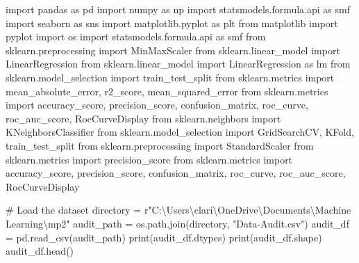 \documentclass[
  11pt,
  letterpaper,
  DIV=11,
  numbers=noendperiod]{scrartcl}
\newenvironment{Shaded}{\begin{snugshade}}{\end{snugshade}}
\newcommand{\BuiltInTok}[1]{\textcolor[rgb]{0.00,0.23,0.31}{#1}}
\newcommand{\CommentTok}[1]{\textcolor[rgb]{0.37,0.37,0.37}{#1}}
\newcommand{\ImportTok}[1]{\textcolor[rgb]{0.00,0.46,0.62}{#1}}
\newcommand{\NormalTok}[1]{\textcolor[rgb]{0.00,0.23,0.31}{#1}}
\newcommand{\OperatorTok}[1]{\textcolor[rgb]{0.37,0.37,0.37}{#1}}
\newcommand{\StringTok}[1]{\textcolor[rgb]{0.13,0.47,0.30}{#1}}
\newcommand{\VerbatimStringTok}[1]{\textcolor[rgb]{0.13,0.47,0.30}{#1}}
\begin{document}
\begin{Shaded}
\begin{Highlighting}[]
\ImportTok{import}\NormalTok{ pandas }\ImportTok{as}\NormalTok{ pd}
\ImportTok{import}\NormalTok{ numpy }\ImportTok{as}\NormalTok{ np}
\ImportTok{import}\NormalTok{ statsmodels.formula.api }\ImportTok{as}\NormalTok{ smf}
\ImportTok{import}\NormalTok{ seaborn }\ImportTok{as}\NormalTok{ sns}
\ImportTok{import}\NormalTok{ matplotlib.pyplot }\ImportTok{as}\NormalTok{ plt}
\ImportTok{from}\NormalTok{ matplotlib }\ImportTok{import}\NormalTok{ pyplot}
\ImportTok{import}\NormalTok{ os}
\ImportTok{import}\NormalTok{ statsmodels.formula.api }\ImportTok{as}\NormalTok{ smf}
\ImportTok{from}\NormalTok{ sklearn.preprocessing }\ImportTok{import}\NormalTok{ MinMaxScaler}
\ImportTok{from}\NormalTok{ sklearn.linear\_model }\ImportTok{import}\NormalTok{ LinearRegression}
\ImportTok{from}\NormalTok{ sklearn.linear\_model }\ImportTok{import}\NormalTok{ LinearRegression }\ImportTok{as}\NormalTok{ lm}
\ImportTok{from}\NormalTok{ sklearn.model\_selection }\ImportTok{import}\NormalTok{ train\_test\_split}
\ImportTok{from}\NormalTok{ sklearn.metrics }\ImportTok{import}\NormalTok{ mean\_absolute\_error, r2\_score, mean\_squared\_error}
\ImportTok{from}\NormalTok{ sklearn.metrics }\ImportTok{import}\NormalTok{ accuracy\_score, precision\_score, confusion\_matrix, roc\_curve, roc\_auc\_score, RocCurveDisplay}
\ImportTok{from}\NormalTok{ sklearn.neighbors }\ImportTok{import}\NormalTok{ KNeighborsClassifier}
\ImportTok{from}\NormalTok{ sklearn.model\_selection }\ImportTok{import}\NormalTok{ GridSearchCV, KFold, train\_test\_split}
\ImportTok{from}\NormalTok{ sklearn.preprocessing }\ImportTok{import}\NormalTok{ StandardScaler}
\ImportTok{from}\NormalTok{ sklearn.metrics }\ImportTok{import}\NormalTok{ precision\_score}
\ImportTok{from}\NormalTok{ sklearn.metrics }\ImportTok{import}\NormalTok{ accuracy\_score, precision\_score, confusion\_matrix, roc\_curve, roc\_auc\_score, RocCurveDisplay}
\end{Highlighting}
\end{Shaded}

\begin{Shaded}
\begin{Highlighting}[]
\CommentTok{\# Load the dataset}
\NormalTok{directory }\OperatorTok{=} \VerbatimStringTok{r"C:\textbackslash{}Users\textbackslash{}clari\textbackslash{}OneDrive\textbackslash{}Documents\textbackslash{}Machine Learning\textbackslash{}mp2"}
\NormalTok{audit\_path }\OperatorTok{=}\NormalTok{ os.path.join(directory, }\StringTok{"Data{-}Audit.csv"}\NormalTok{)}
\NormalTok{audit\_df }\OperatorTok{=}\NormalTok{ pd.read\_csv(audit\_path)}
\BuiltInTok{print}\NormalTok{(audit\_df.dtypes)}
\BuiltInTok{print}\NormalTok{(audit\_df.shape)}
\NormalTok{audit\_df.head()}
\end{Highlighting}
\end{Shaded}
\end{document}
